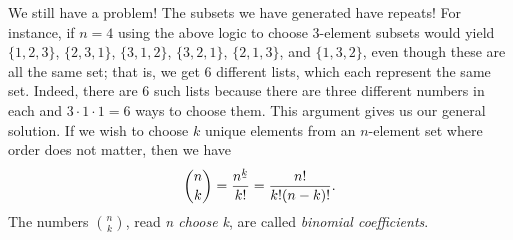 \documentclass[12pt, letterpaper]{article}
\theoremstyle{definition}
\newcommand{\fallingfactorial}[1]{%
  ^{\mspace{2mu}\underline{\mspace{-2mu}#1\mspace{-2mu}}\mspace{2mu}}%
}
\begin{document}
We still have a problem! The subsets we have generated have repeats!
For instance, if $n=4$ using the above logic to choose 3-element subsets would
yield $\{1,2,3\}$, $\{2,3,1\}$, $\{3,1,2\}$, $\{3,2,1\}$, $\{2,1,3\}$, and $\{1,3,2\}$,
even though these are all the same set; that is, we get 6 different lists,
which each represent the same set. Indeed, there are 6 such lists
because there are three different numbers in each and $3 \cdot 1 \cdot 1 = 6$
ways to choose them. This argument gives us our general solution. If we wish
to choose $k$ unique elements from an $n$-element set where order does not matter,
then we have
\begin{equation*}
    \binom{n}{k} = \frac{n\fallingfactorial{k}}{k!} = \frac{n!}{k!(n-k)!}.
\end{equation*}
The numbers $\binom{n}{k}$, read \emph{n choose k}, are called
\emph{binomial coefficients}.
\end{document}
